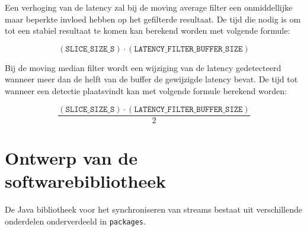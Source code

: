 Een verhoging van de latency zal bij de moving average filter een onmiddellijke maar beperkte invloed hebben op het gefilterde resultaat. De tijd die nodig is om tot een stabiel resultaat te komen kan berekend worden met volgende formule:

\begin{equation}
	(\texttt{SLICE\_SIZE\_S}) \cdot (\texttt{LATENCY\_FILTER\_BUFFER\_SIZE})
\end{equation}

Bij de moving median filter wordt een wijziging van de latency gedetecteerd wanneer meer dan de helft van de buffer de gewijzigde latency bevat. De tijd tot wanneer een detectie plaatsvindt kan met volgende formule berekend worden:

\begin{equation}
\frac{(\texttt{SLICE\_SIZE\_S}) \cdot (\texttt{LATENCY\_FILTER\_BUFFER\_SIZE})}{2}
\end{equation}

\section{Ontwerp van de softwarebibliotheek}
\label{ontwerp}

De Java bibliotheek voor het synchroniseren van streams bestaat uit verschillende onderdelen onderverdeeld in \texttt{packages}.

